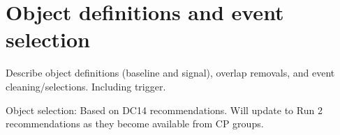 \section{Object definitions and event selection}
\label{sec:selection}

Describe object definitions (baseline and signal), overlap removals, and event cleaning/selections. Including trigger.


Object selection: Based on DC14 recommendations. Will update to Run 2 recommendations as they become available from CP groups.
